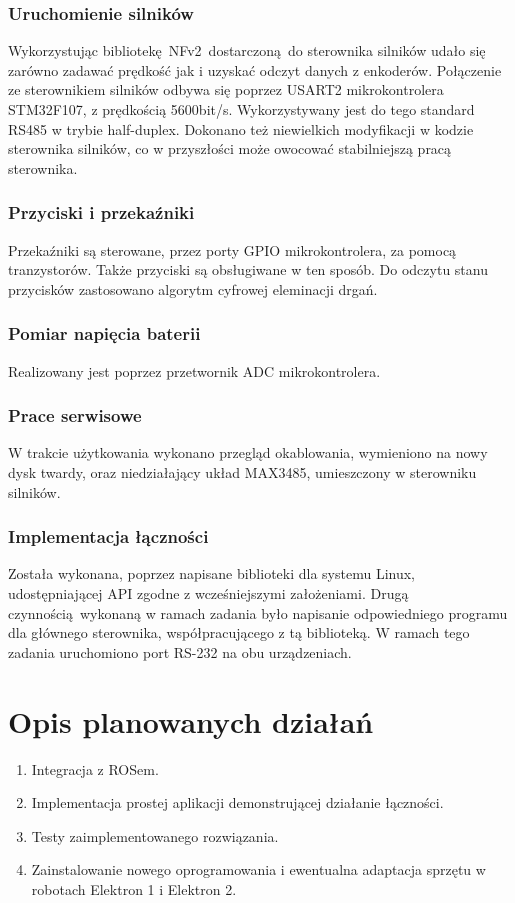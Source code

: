 \documentclass[10pt,a4paper]{article}
\begin{document}
	\subsubsection{Uruchomienie silników}
	Wykorzystując bibliotekę NFv2 dostarczoną do sterownika silników udało się zarówno zadawać prędkość jak i uzyskać odczyt danych z enkoderów. Połączenie ze sterownikiem silników odbywa się poprzez USART2 mikrokontrolera STM32F107, z prędkością 5600bit/s. Wykorzystywany jest do tego standard RS485 w trybie half-duplex. Dokonano też niewielkich modyfikacji w kodzie sterownika silników, co w przyszłości może owocować stabilniejszą pracą sterownika.
	\subsubsection{Przyciski i przekaźniki}
	Przekaźniki są sterowane, przez porty GPIO mikrokontrolera, za pomocą tranzystorów. Także przyciski są obsługiwane w ten sposób. Do odczytu stanu przycisków zastosowano algorytm cyfrowej eleminacji drgań.
	\subsubsection{Pomiar napięcia baterii}
	Realizowany jest poprzez przetwornik ADC mikrokontrolera.
	\subsubsection{Prace serwisowe}
	W trakcie użytkowania wykonano przegląd okablowania, wymieniono na nowy dysk twardy, oraz niedziałający układ MAX3485, umieszczony w sterowniku silników.
	\subsubsection{Implementacja łączności}
	Została wykonana, poprzez napisane biblioteki dla systemu Linux, udostępniającej API zgodne z wcześniejszymi założeniami. Drugą czynnością wykonaną w ramach zadania było napisanie odpowiedniego programu dla głównego sterownika, współpracującego z tą biblioteką. W ramach tego zadania uruchomiono port RS-232 na obu urządzeniach.
	
	
	\section{Opis planowanych działań}
	\begin{enumerate}
		\item Integracja z ROSem.
		\item Implementacja prostej aplikacji demonstrującej działanie łączności.
		\item Testy zaimplementowanego rozwiązania. 
		\item Zainstalowanie nowego oprogramowania i ewentualna adaptacja sprzętu w robotach Elektron 1 i Elektron 2.
	\end{enumerate}
\end{document}
